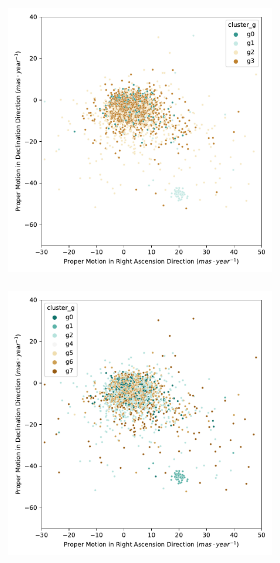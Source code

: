 \documentclass[11pt, a4paper, english]{book}
\begin{document}
\begin{figure}[htbp]
\begin{subfigure}{0.9\textwidth}
\begin{subfigure}[t]{0.3\textwidth}
      \includegraphics[width=\textwidth]{../figures/kmeans_n5_pm_melotte_22.pdf}
    \end{subfigure}
    \hfill
    \begin{subfigure}[t]{0.3\textwidth}
      \centering
      \includegraphics[width=\textwidth]{../figures/kmeans_n8_pm_melotte_22.pdf}

\end{subfigure}
\end{subfigure}
\end{figure}
\end{document}
